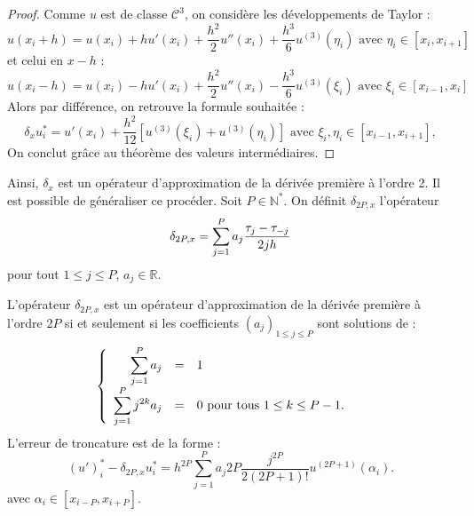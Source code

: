 \begin{proof}
Comme $u$ est de classe $\mathcal{C}^3$, on considère les développements de Taylor :
\begin{equation}
u(x_i+h) = u(x_i) + h u'(x_i) + \dfrac{h^2}{2} u''(x_i) + \dfrac{h^3}{6} u^{(3)} (\eta_i) \text{ avec } \eta_i \in [x_i, x_{i+1}]
\end{equation}
et celui en $x-h$ :
\begin{equation}
u(x_i-h) = u(x_i) - h u'(x_i) + \dfrac{h^2}{2} u''(x_i) - \dfrac{h^3}{6}u^{(3)}(\xi_i) \text{ avec } \xi_i \in [x_{i-1}, x_{i}]
\end{equation}
Alors par différence, on retrouve la formule souhaitée : 
\begin{equation}
\delta_x u^*_i = u'(x_i) + \dfrac{h^2}{12} \left[ u^{(3)}(\xi_i) + u^{(3)}(\eta_i) \right]  \text{ avec } \xi_i, \eta_i \in [x_{i-1}, x_{i+1}],
\end{equation}
On conclut grâce au théorème des valeurs intermédiaires.
\end{proof}

Ainsi, $\delta_x$ est un opérateur d'approximation de la dérivée première à l'ordre 2. Il est possible de généraliser ce procéder.
Soit $P \in \mathbb{N}^*$. 
On définit $\delta_{2P,x}$ l'opérateur
\begin{equation}
\delta_{2P,x} = \displaystyle\sum\limits_{j=1}^P a_j \dfrac{\tau_j - \tau_{-j}}{2 j h}
\label{eq:explicite_dx}
\end{equation}
pour tout $1 \leq j \leq P$, $a_j \in \mathbb{R}$. 




\begin{theoreme}
L'opérateur $\delta_{2P,x}$ est un opérateur d'approximation de la dérivée première à l'ordre $2P$ si et seulement si les coefficients $(a_j)_{1 \leq j \leq P}$ sont solutions de :
\begin{equation}
\left\lbrace
\begin{array}{rcll}
\displaystyle\sum\limits_{j=1}^P a_j & = & 1 & \\
\displaystyle\sum\limits_{j=1}^P j^{2k} a_j & = & 0 \text{ pour tous } 1 \leq k \leq P-1.
\end{array}
\right.
\label{eq:syst_opexplicite_P}
\end{equation}
L'erreur de troncature est de la forme :
\begin{equation}
\left(u' \right)_i^* - \delta_{2P,x} u^*_i = h^{2P}\sum_{j=1}^P a_j 2P \dfrac{j^{2P}}{2(2P+1)!} u^{(2P+1)}(\alpha_i) .
\end{equation}
avec $\alpha_i \in [x_{i-P}, x_{i+P}]$.
\label{th:consistance_delta_x_explicite}
\end{theoreme}

